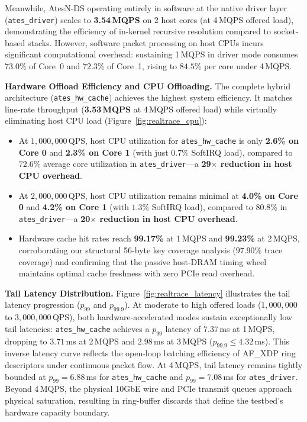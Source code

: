 \documentclass[a4paper,fleqn,colorlinks,hidelinks]{cas-sc}
\begin{document}
Meanwhile, AtesN-DS operating entirely in software at the native driver layer (\texttt{ates\_driver}) scales to \textbf{3.54\,MQPS} on 2 host cores (at 4\,MQPS offered load), demonstrating the efficiency of in-kernel recursive resolution compared to socket-based stacks. However, software packet processing on host CPUs incurs significant computational overhead: sustaining 1\,MQPS in driver mode consumes $73.0\%$ of Core~0 and $72.3\%$ of Core~1, rising to $84.5\%$ per core under 4\,MQPS.

\textbf{Hardware Offload Efficiency and CPU Offloading.}
The complete hybrid architecture (\texttt{ates\_hw\_cache}) achieves the highest system efficiency. It matches line-rate throughput (\textbf{3.53\,MQPS} at 4\,MQPS offered load) while virtually eliminating host CPU load (Figure~\ref{fig:realtrace_cpu}):
\begin{itemize}
    \item At $1{,}000{,}000$\,QPS, host CPU utilization for \texttt{ates\_hw\_cache} is only \textbf{2.6\% on Core 0} and \textbf{2.3\% on Core 1} (with just $0.7\%$ SoftIRQ load), compared to $72.6\%$ average core utilization in \texttt{ates\_driver}—a \textbf{29$\times$ reduction in host CPU overhead}.
    \item At $2{,}000{,}000$\,QPS, host CPU utilization remains minimal at \textbf{4.0\% on Core 0} and \textbf{4.2\% on Core 1} (with $1.3\%$ SoftIRQ load), compared to $80.8\%$ in \texttt{ates\_driver}—a \textbf{20$\times$ reduction in host CPU overhead}.
    \item Hardware cache hit rates reach \textbf{99.17\%} at 1\,MQPS and \textbf{99.23\%} at 2\,MQPS, corroborating our structural 56-byte key coverage analysis ($97.90\%$ trace coverage) and confirming that the passive host-DRAM timing wheel maintains optimal cache freshness with zero PCIe read overhead.
\end{itemize}

\textbf{Tail Latency Distribution.}
Figure~\ref{fig:realtrace_latency} illustrates the tail latency progression ($p_{99}$ and $p_{99.9}$). At moderate to high offered loads ($1{,}000{,}000$ to $3{,}000{,}000$\,QPS), both hardware-accelerated modes sustain exceptionally low tail latencies: \texttt{ates\_hw\_cache} achieves a $p_{99}$ latency of $7.37$\,ms at 1\,MQPS, dropping to $3.71$\,ms at 2\,MQPS and $2.98$\,ms at 3\,MQPS ($p_{99.9} \le 4.32$\,ms). This inverse latency curve reflects the open-loop batching efficiency of AF\_XDP ring descriptors under continuous packet flow. At 4\,MQPS, tail latency remains tightly bounded at $p_{99} = 6.88$\,ms for \texttt{ates\_hw\_cache} and $p_{99} = 7.08$\,ms for \texttt{ates\_driver}. Beyond 4\,MQPS, the physical 10GbE wire and PCIe transmit queues approach physical saturation, resulting in ring-buffer discards that define the testbed's hardware capacity boundary.
\end{document}

